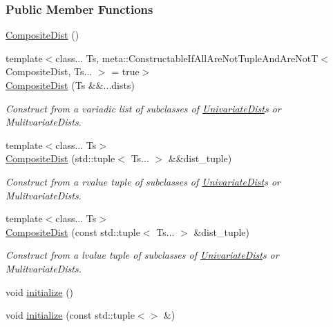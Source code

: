 \subsubsection*{Public Member Functions}
\begin{DoxyCompactItemize}
\item 
\hyperlink{classprior__hessian_1_1CompositeDist_a0a97c92fc8649f39063fb66070b0c49c}{Composite\+Dist} ()
\item 
{\footnotesize template$<$class... Ts, meta\+::\+Constructable\+If\+All\+Are\+Not\+Tuple\+And\+Are\+Not\+T$<$ Composite\+Dist, Ts... $>$  = true$>$ }\\\hyperlink{classprior__hessian_1_1CompositeDist_a60f58ad66846c3e1ac4a5ab68f615ee4}{Composite\+Dist} (Ts \&\&...dists)
\begin{DoxyCompactList}\small\item\em Construct from a variadic list of subclasses of \hyperlink{classprior__hessian_1_1UnivariateDist}{Univariate\+Dist}\textquotesingle{}s or Mulitvariate\+Dist\textquotesingle{}s. \end{DoxyCompactList}\item 
{\footnotesize template$<$class... Ts$>$ }\\\hyperlink{classprior__hessian_1_1CompositeDist_ac63d64a9a02d66d2f678b3ae4ba492b7}{Composite\+Dist} (std\+::tuple$<$ Ts... $>$ \&\&dist\+\_\+tuple)
\begin{DoxyCompactList}\small\item\em Construct from a rvalue tuple of subclasses of \hyperlink{classprior__hessian_1_1UnivariateDist}{Univariate\+Dist}\textquotesingle{}s or Mulitvariate\+Dist\textquotesingle{}s. \end{DoxyCompactList}\item 
{\footnotesize template$<$class... Ts$>$ }\\\hyperlink{classprior__hessian_1_1CompositeDist_ab80e73297dff1dece54e7605a50b66ba}{Composite\+Dist} (const std\+::tuple$<$ Ts... $>$ \&dist\+\_\+tuple)
\begin{DoxyCompactList}\small\item\em Construct from a lvalue tuple of subclasses of \hyperlink{classprior__hessian_1_1UnivariateDist}{Univariate\+Dist}\textquotesingle{}s or Mulitvariate\+Dist\textquotesingle{}s. \end{DoxyCompactList}\item 
void \hyperlink{classprior__hessian_1_1CompositeDist_a23f28c6f0f08830056525325a61d820d}{initialize} ()
\item 
void \hyperlink{classprior__hessian_1_1CompositeDist_aff238c9365b9c1167781858af7a7bbd8}{initialize} (const std\+::tuple$<$$>$ \&)
$$
\end{DoxyCompactItemize}
